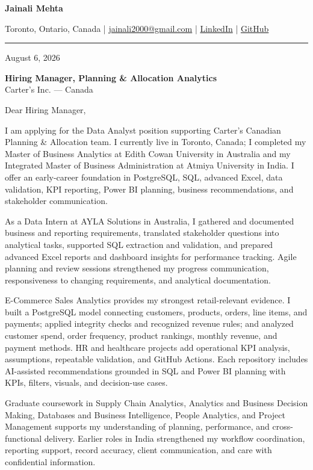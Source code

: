 \documentclass[letterpaper,10pt]{article}
\begin{document}
\begin{center}
  {\fontsize{17}{19}\selectfont\textbf{Jainali Mehta}}\par\vspace{2pt}
  \small Toronto, Ontario, Canada \;|\;
  \href{mailto:jainali2000@gmail.com}{jainali2000@gmail.com} \;|\;
  \href{https://www.linkedin.com/in/jainali-mehta}{LinkedIn} \;|\;
  \href{https://github.com/jainalimehta}{GitHub}
\end{center}
\vspace{-5pt}
\noindent\rule{\textwidth}{0.4pt}

August 6, 2026

\textbf{Hiring Manager, Planning \& Allocation Analytics}\\
Carter's Inc. --- Canada

Dear Hiring Manager,

I am applying for the Data Analyst position supporting Carter's Canadian Planning \& Allocation team. I currently live in Toronto, Canada; I completed my Master of Business Analytics at Edith Cowan University in Australia and my Integrated Master of Business Administration at Atmiya University in India. I offer an early-career foundation in PostgreSQL, SQL, advanced Excel, data validation, KPI reporting, Power BI planning, business recommendations, and stakeholder communication.

As a Data Intern at AYLA Solutions in Australia, I gathered and documented business and reporting requirements, translated stakeholder questions into analytical tasks, supported SQL extraction and validation, and prepared advanced Excel reports and dashboard insights for performance tracking. Agile planning and review sessions strengthened my progress communication, responsiveness to changing requirements, and analytical documentation.

E-Commerce Sales Analytics provides my strongest retail-relevant evidence. I built a PostgreSQL model connecting customers, products, orders, line items, and payments; applied integrity checks and recognized revenue rules; and analyzed customer spend, order frequency, product rankings, monthly revenue, and payment methods. HR and healthcare projects add operational KPI analysis, assumptions, repeatable validation, and GitHub Actions. Each repository includes AI-assisted recommendations grounded in SQL and Power BI planning with KPIs, filters, visuals, and decision-use cases.

Graduate coursework in Supply Chain Analytics, Analytics and Business Decision Making, Databases and Business Intelligence, People Analytics, and Project Management supports my understanding of planning, performance, and cross-functional delivery. Earlier roles in India strengthened my workflow coordination, reporting support, record accuracy, client communication, and care with confidential information.
\end{document}

